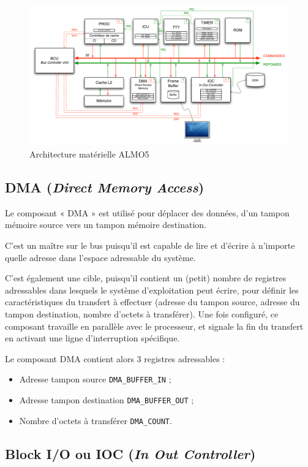 \documentclass[11pt,english,french]{scrreprt}
\theoremstyle{remark}
\theoremstyle{definition}
\begin{document}
\begin{figure}[!h]
	\center
	\includegraphics[scale=.60]{diagrammes/architecture-finale}
	\caption{Architecture matérielle ALMO5}
\end{figure}

\subsection{DMA (\emph{Direct Memory Access})} %

Le composant « DMA » est utilisé pour déplacer des données, d’un tampon mémoire source vers un tampon mémoire destination. 

C’est un maître sur le bus puisqu’il est capable de lire et d’écrire à n’importe quelle adresse dans l’espace adressable du système. 

C’est également une cible, puisqu’il contient un (petit) nombre de registres adressables dans lesquels le système d’exploitation peut écrire, pour définir les caractéristiques du transfert à effectuer (adresse du tampon source, adresse du tampon destination, nombre d’octets à transférer). Une fois configuré, ce composant travaille en parallèle avec le processeur, et signale la fin du transfert en activant une ligne d’interruption spécifique.

Le composant DMA contient alors 3 registres adressables :\begin{itemize}
	\item Adresse tampon source \lstinline!DMA_BUFFER_IN! ;
	\item Adresse tampon destination \lstinline!DMA_BUFFER_OUT! ;
	\item Nombre d'octets à transférer \lstinline!DMA_COUNT!.
\end{itemize}

\subsection{Block I/O ou IOC (\emph{In Out Controller})} %
\end{document}
